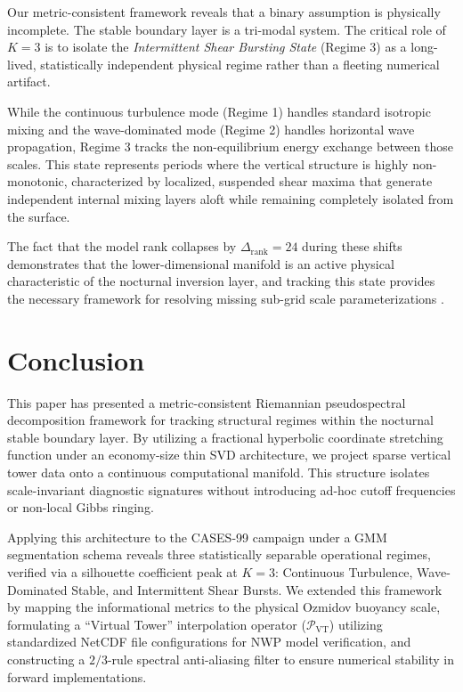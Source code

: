 Our metric-consistent framework reveals that a binary assumption is physically incomplete. The stable boundary layer is a tri-modal system. The critical role of $K=3$ is to isolate the \emph{Intermittent Shear Bursting State} (Regime 3) as a long-lived, statistically independent physical regime rather than a fleeting numerical artifact.

While the continuous turbulence mode (Regime 1) handles standard isotropic mixing and the wave-dominated mode (Regime 2) handles horizontal wave propagation, Regime 3 tracks the non-equilibrium energy exchange between those scales. This state represents periods where the vertical structure is highly non-monotonic, characterized by localized, suspended shear maxima that generate independent internal mixing layers aloft while remaining completely isolated from the surface.

The fact that the model rank collapses by $\Delta_{\mathrm{rank}} = 24$ during these shifts demonstrates that the lower-dimensional manifold is an active physical characteristic of the nocturnal inversion layer, and tracking this state provides the necessary framework for resolving missing sub-grid scale parameterizations \citep{Urbancic2024, Mosso2025}.

\section{Conclusion}
\label{sec:conclusion}

This paper has presented a metric-consistent Riemannian pseudospectral decomposition framework for tracking structural regimes within the nocturnal stable boundary layer. By utilizing a fractional hyperbolic coordinate stretching function under an economy-size thin SVD architecture, we project sparse vertical tower data onto a continuous computational manifold. This structure isolates scale-invariant diagnostic signatures without introducing ad-hoc cutoff frequencies or non-local Gibbs ringing.

Applying this architecture to the CASES-99 campaign under a GMM segmentation schema reveals three statistically separable operational regimes, verified via a silhouette coefficient peak at $K=3$: Continuous Turbulence, Wave-Dominated Stable, and Intermittent Shear Bursts. We extended this framework by mapping the informational metrics to the physical Ozmidov buoyancy scale, formulating a ``Virtual Tower'' interpolation operator ($\mathcal{P}_{\text{VT}}$) utilizing standardized NetCDF file configurations for NWP model verification, and constructing a $2/3$-rule spectral anti-aliasing filter to ensure numerical stability in forward implementations.

